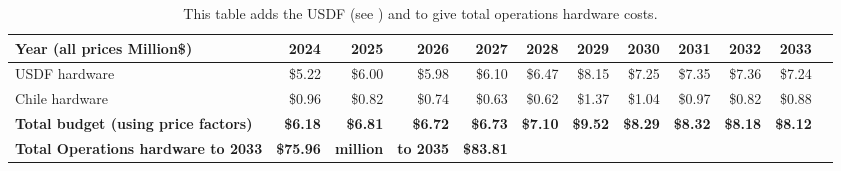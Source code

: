 \tiny \begin{longtable} { |p{}  |r  |r  |r  |r  |r  |r  |r  |r  |r  |r  |r |} 
\caption{This table adds the USDF (see ) and  to give total operations hardware costs. \label{tab:opsSummary}}\\ 
\hline 
\textbf{Year  (all prices Million\$)}&\textbf{2024}&\textbf{2025}&\textbf{2026}&\textbf{2027}&\textbf{2028}&\textbf{2029}&\textbf{2030}&\textbf{2031}&\textbf{2032}&\textbf{2033} \\ \hline
{USDF hardware}&{\$5.22}&{\$6.00}&{\$5.98}&{\$6.10}&{\$6.47}&{\$8.15}&{\$7.25}&{\$7.35}&{\$7.36}&{\$7.24} \\ \hline
{Chile hardware}&{\$0.96}&{\$0.82}&{\$0.74}&{\$0.63}&{\$0.62}&{\$1.37}&{\$1.04}&{\$0.97}&{\$0.82}&{\$0.88} \\ \hline
\textbf{Total budget (using price factors)}&\textbf{\$6.18}&\textbf{\$6.81}&\textbf{\$6.72}&\textbf{\$6.73}&\textbf{\$7.10}&\textbf{\$9.52}&\textbf{\$8.29}&\textbf{\$8.32}&\textbf{\$8.18}&\textbf{\$8.12} \\ \hline
\textbf{Total Operations hardware to 2033}&\textbf{\$75.96}&\textbf{million}&\textbf{to 2035}&\textbf{\$83.81}&&&&&& \\ \hline
\end{longtable} \normalsize
